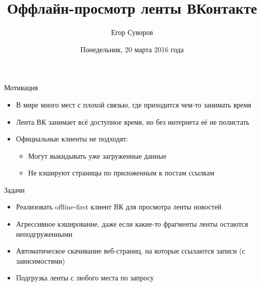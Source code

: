 \documentclass[utf8,xcolor=table]{beamer}
\title{Оффлайн-просмотр ленты ВКонтакте}
\author{Егор Суворов}
\institute[СПб АУ]{Практика, осень 2015--зима 2016}
\date[21.03.2016]{Понедельник, 20 марта 2016 года}
\begin{document}
\begin{frame}
\titlepage
\end{frame}

\begin{frame}[t]{Мотивация}
	\begin{itemize}
		\item В мире много мест с плохой связью, где приходится чем-то занимать время
		\item Лента ВК занимает всё доступное время, но без интернета её не полистать
		\item Официальные клиенты не подходят:
			\begin{itemize}
				\item Могут выкидывать уже загруженные данные
				\item Не кэшируют страницы по приложенным к постам ссылкам
			\end{itemize}
	\end{itemize}
\end{frame}

\begin{frame}[t]{Задачи}
	\begin{itemize}
		\item Реализовать offline-first клиент ВК для просмотра ленты новостей
		\item Агрессивное кэширование, даже если какие-то фрагменты ленты остаются неподгруженными
		\item Автоматическое скачивание веб-страниц, на которые ссылаются записи (с зависимостями)
		\item Подгрузка ленты с любого места по запросу
	\end{itemize}
\end{frame}
\end{document}
